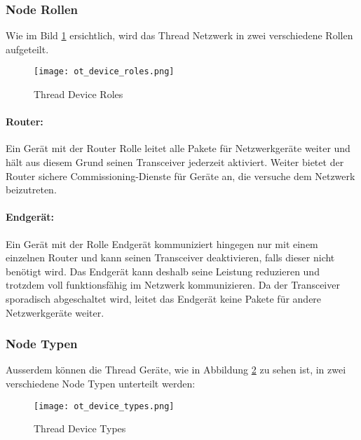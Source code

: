 \subsubsection{Node Rollen}\label{subsubsec:NodeRollen}
Wie im Bild \ref{fig:ThreadDeviceRoles} ersichtlich, wird das Thread Netzwerk in zwei verschiedene Rollen aufgeteilt. \cite[Seite 1-4]{thread_group_inc_thread_2017}

\begin{figure}[H]
	\centering
	\texttt{[image: ot\_device\_roles.png]}
	\caption{Thread Device Roles \cite{openthread_ot-primer-roles_2xpng_2016}}\label{fig:ThreadDeviceRoles}
\end{figure}

\paragraph{Router:}
Ein Gerät mit der Router Rolle leitet alle Pakete für Netzwerkgeräte weiter und hält aus diesem Grund seinen Transceiver jederzeit aktiviert. Weiter bietet der Router sichere Commissioning-Dienste für Geräte an, die versuche dem Netzwerk beizutreten. \cite[Seite 1-4]{thread_group_inc_thread_2017}

\paragraph{Endgerät:}
Ein Gerät mit der Rolle Endgerät kommuniziert hingegen nur mit einem einzelnen Router und kann seinen Transceiver deaktivieren, falls dieser nicht benötigt wird. Das Endgerät kann deshalb seine Leistung reduzieren und trotzdem voll funktionsfähig im Netzwerk kommunizieren. Da der Transceiver sporadisch abgeschaltet wird, leitet das Endgerät keine Pakete für andere Netzwerkgeräte weiter. \cite[Seite 1-4]{thread_group_inc_thread_2017}

\newpage
\subsubsection{Node Typen}\label{subsubsec:NodeTypen}
Ausserdem können die Thread Geräte, wie in Abbildung \ref{fig:ThreadDeviceTypes} zu sehen ist, in zwei verschiedene Node Typen unterteilt werden: \cite[Seite 1-4]{thread_group_inc_thread_2017}
\begin{figure}[H]
	\centering
	\texttt{[image: ot\_device\_types.png]}
	\caption{Thread Device Types \cite{openthread_ot-primer-taxonomy_2xpng_2016}}\label{fig:ThreadDeviceTypes}
\end{figure}

